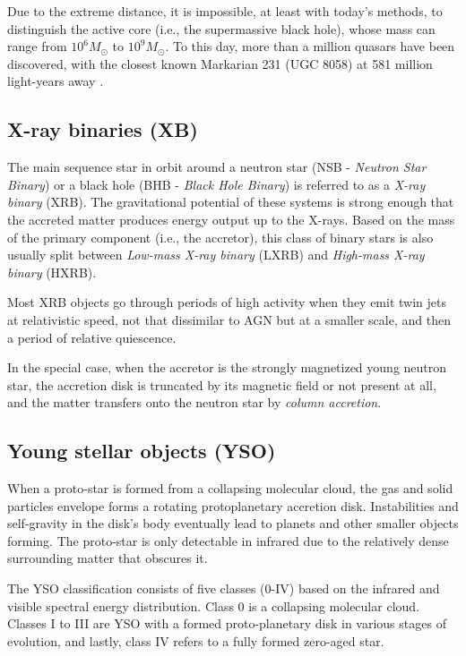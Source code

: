     Due to the extreme distance, it is impossible, at least with today's methods, to distinguish the active core (i.e., the supermassive black hole), whose mass can range from $10^6 M_{\odot}$ to $10^{9} M_{\odot}$. To this day, more than a million quasars have been discovered, with the closest known Markarian 231 (UGC 8058) at 581 million light-years away \citep{gaia2018}. 


\subsection{X-ray binaries (XB)}
    The main sequence star in orbit around a neutron star (NSB - \emph{Neutron Star Binary}) or a black hole (BHB - \emph{Black Hole Binary}) is referred to as a \emph{X-ray binary} (XRB). The gravitational potential of these systems is strong enough that the accreted matter produces energy output up to the X-rays. Based on the mass of the primary component (i.e., the accretor), this class of binary stars is also usually split between \emph{Low-mass X-ray binary} (LXRB) and \emph{High-mass X-ray binary} (HXRB). 

    Most XRB objects go through periods of high activity when they emit twin jets at relativistic speed, not that dissimilar to AGN but at a smaller scale, and then a period of relative quiescence.

    In the special case, when the accretor is the strongly magnetized young neutron star, the accretion disk is truncated by its magnetic field or not present at all, and the matter transfers onto the neutron star by \emph{column accretion}.
    

\subsection{Young stellar objects (YSO)}
    When a proto-star is formed from a collapsing molecular cloud, the gas and solid particles envelope forms a rotating protoplanetary accretion disk. Instabilities and self-gravity in the disk's body eventually lead to planets and other smaller objects forming. The proto-star is only detectable in infrared due to the relatively dense surrounding matter that obscures it. 

    The YSO classification consists of five classes (0-IV) based on the infrared and visible spectral energy distribution. Class 0 is a collapsing molecular cloud. Classes I to III are YSO with a formed proto-planetary disk in various stages of evolution, and lastly, class IV refers to a fully formed zero-aged star. 

